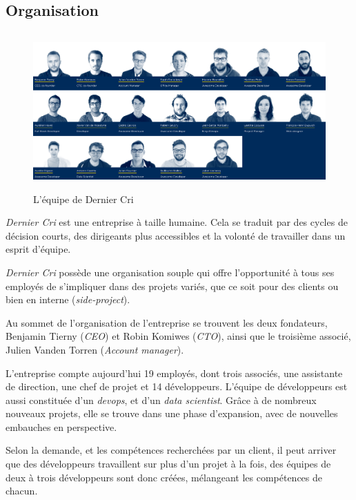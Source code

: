 \documentclass[12pt,a4paper]{article}
\begin{document}
  \bigskip

  \subsection{Organisation}\label{organisation}

  \begin{figure}[h]
    \centering
    \includegraphics[height=6cm]{figures/team.png}
    \caption{L'équipe de Dernier Cri}
  \end{figure}

  \bigskip

  \emph{Dernier Cri} est une entreprise à taille humaine. Cela se traduit
  par des cycles de décision courts, des dirigeants plus accessibles et la
  volonté de travailler dans un esprit d'équipe.

  \bigskip

  \emph{Dernier Cri} possède une organisation souple qui offre
  l'opportunité à tous ses employés de s'impliquer dans des projets
  variés, que ce soit pour des clients ou bien en interne
  (\emph{side-project}).

  \bigskip

  Au sommet de l'organisation de l'entreprise se trouvent les deux
  fondateurs, Benjamin Tierny (\emph{CEO}) et Robin Komiwes (\emph{CTO}),
  ainsi que le troisième associé, Julien Vanden Torren (\emph{Account
  manager}).

  \bigskip

  L'entreprise compte aujourd'hui 19 employés, dont trois associés, une
  assistante de direction, une chef de projet et 14 développeurs. L'équipe
  de développeurs est aussi constituée d'un \emph{devops}, et d'un
  \emph{data scientist}. Grâce à de nombreux nouveaux projets, elle se
  trouve dans une phase d'expansion, avec de nouvelles embauches en
  perspective.

  \bigskip

  Selon la demande, et les compétences recherchées par un client, il peut
  arriver que des développeurs travaillent sur plus d'un projet à la fois,
  des équipes de deux à trois développeurs sont donc créées, mélangeant
  les compétences de chacun.
\end{document}
